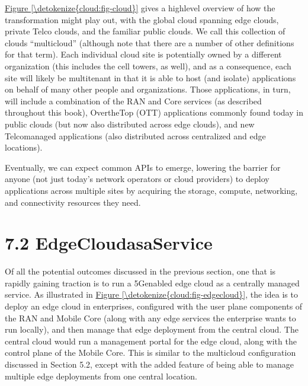 \documentclass[a4paper,11pt,english]{sphinxmanual}
\begin{document}
\sphinxAtStartPar
\hyperref[\detokenize{cloud:fig-cloud}]{Figure \ref{\detokenize{cloud:fig-cloud}}} gives a high\sphinxhyphen{}level overview of how the
transformation might play out, with the global cloud spanning edge
clouds, private Telco clouds, and the familiar public clouds. We call
this collection of clouds “multi\sphinxhyphen{}cloud” (although note that there are
a number of other definitions for that term). Each
individual cloud site is potentially owned by a different organization
(this includes the cell towers, as well), and as a consequence, each
site will likely be multi\sphinxhyphen{}tenant in that it is able to host (and
isolate) applications on behalf of many other people and organizations.
Those applications, in turn, will include a combination of the RAN and
Core services (as described throughout this book), Over\sphinxhyphen{}the\sphinxhyphen{}Top (OTT)
applications commonly found today in public clouds (but now also
distributed across edge clouds), and new Telco\sphinxhyphen{}managed applications
(also distributed across centralized and edge locations).

\sphinxAtStartPar
Eventually, we can expect common APIs to emerge, lowering the barrier
for anyone (not just today’s network operators or cloud providers) to
deploy applications across multiple sites by acquiring the storage,
compute, networking, and connectivity resources they need.


\section{7.2 EdgeCloud\sphinxhyphen{}as\sphinxhyphen{}a\sphinxhyphen{}Service}
\label{\detokenize{cloud:edgecloud-as-a-service}}
\sphinxAtStartPar
Of all the potential outcomes discussed in the previous section, one
that is rapidly gaining traction is to run a 5G\sphinxhyphen{}enabled edge cloud as
a centrally managed service. As illustrated in \hyperref[\detokenize{cloud:fig-edgecloud}]{Figure \ref{\detokenize{cloud:fig-edgecloud}}}, the idea is to deploy an edge cloud in enterprises,
configured with the user plane components of the RAN and Mobile Core
(along with any edge services the enterprise wants to run locally),
and then manage that edge deployment from the central cloud. The
central cloud would run a management portal for the edge cloud, along
with the control plane of the Mobile Core. This is similar to the
multi\sphinxhyphen{}cloud configuration discussed in Section 5.2, except with the
added feature of being able to manage multiple edge deployments from
one central location.
\end{document}
